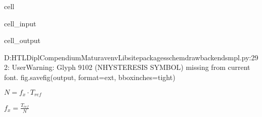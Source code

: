 \documentclass[letterpaper,10pt,english]{jupyterBook}
\begin{document}
\begin{sphinxuseclass}{cell}
\begin{sphinxVerbatimInput}
\begin{sphinxuseclass}{cell_input}
\end{sphinxuseclass}\end{sphinxVerbatimInput}
\begin{sphinxVerbatimOutput}

\begin{sphinxuseclass}{cell_output}
\begin{sphinxVerbatim}[commandchars=\\\{\}]
D:\PYGZbs{}\PYGZus{}\PYGZus{}HTL\PYGZbs{}Dipl\PYGZbs{}CompendiumMatura\PYGZbs{}venv\PYGZbs{}Lib\PYGZbs{}site\PYGZhy{}packages\PYGZbs{}schemdraw\PYGZbs{}backends\PYGZbs{}mpl.py:292: UserWarning: Glyph 9102 (\PYGZbs{}N\PYGZob{}HYSTERESIS SYMBOL\PYGZcb{}) missing from current font.
  fig.savefig(output, format=ext, bbox\PYGZus{}inches=\PYGZsq{}tight\PYGZsq{})
\end{sphinxVerbatim}

\noindent{}

\end{sphinxuseclass}\end{sphinxVerbatimOutput}

\end{sphinxuseclass}
\begin{DUlineblock}{0em}
\item[] 
\end{DUlineblock}

\sphinxAtStartPar
{}

\begin{DUlineblock}{0em}
\item[] 
\end{DUlineblock}

\sphinxAtStartPar
\(N = f_x \cdot T_{ref}\)

\sphinxAtStartPar
\(f_x = \frac{T_{ref}}{N}\)

\begin{DUlineblock}{0em}
\item[] 
\end{DUlineblock}

\begin{DUlineblock}{0em}
\item[] 
\end{DUlineblock}
\end{document}
